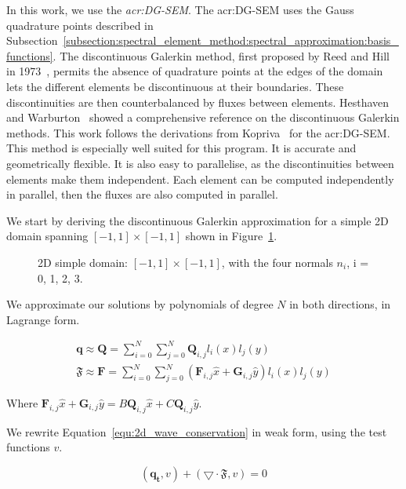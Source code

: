 In this work, we use the \textit{\acrfull{acr:DG-SEM}}. The \acrshort{acr:DG-SEM} uses the Gauss
quadrature points described in
Subsection~\ref{subsection:spectral_element_method:spectral_approximation:basis_functions}. The
discontinuous Galerkin method, first proposed by Reed and Hill in 1973~\cite{Reed1973}, permits the
absence of quadrature points at the edges of the domain lets the different elements be discontinuous
at their boundaries. These discontinuities are then counterbalanced by fluxes between elements.
Hesthaven and Warburton~\cite{Hesthaven2007} showed a comprehensive reference on the discontinuous
Galerkin methods. This work follows the derivations from Kopriva~\cite{Kopriva2009} for the
\acrshort{acr:DG-SEM}. This method is especially well suited for this program. It is accurate and
geometrically flexible. It is also easy to parallelise, as the discontinuities between elements make
them independent. Each element can be computed independently in parallel, then the fluxes are also
computed in parallel.

We start by deriving the discontinuous Galerkin approximation for a simple 2D domain spanning
$\left[ -1, 1 \right] \times \left[ -1, 1 \right]$ shown in Figure~\ref{fig:simple_domain}.

\begin{figure}[H]
	\centering
	
	\caption{2D simple domain: $\left[ -1, 1 \right] \times \left[ -1, 1 \right]$, with the four normals $n_i$, i = 0, 1, 2, 3.}
	\label{fig:simple_domain}
\end{figure}

We approximate our solutions by polynomials of degree $N$ in both directions, in Lagrange
form. 

\begin{gather}
	\mathbf{q} \approx \mathbf{Q} = \sum_{i = 0}^{N}\sum_{j = 0}^{N}\mathbf{Q}_{i,j}l_i(x)l_j(y) \\
	\mathfrak{F} \approx \mathbf{F} = \sum_{i = 0}^{N} \sum_{j = 0}^{N} \left ( \mathbf{F}_{i, j} \widehat{x} + \mathbf{G}_{i, j}\widehat{y}\right ) l_i(x) l_j(y)
\end{gather}

Where $\mathbf{F}_{i, j} \widehat{x} + \mathbf{G}_{i, j}\widehat{y} = B \mathbf{Q}_{i, j}\widehat{x}
+ C \mathbf{Q}_{i, j}\widehat{y}$. 

We rewrite Equation~\ref{equ:2d_wave_conservation} in weak form, using the test functions $v$.

\begin{equation} \label{equ:2d_wave_weak}
	\left( \mathbf{q_t}, v \right) + \left( \bigtriangledown \cdot \mathfrak{F}, v \right) = 0
\end{equation}

